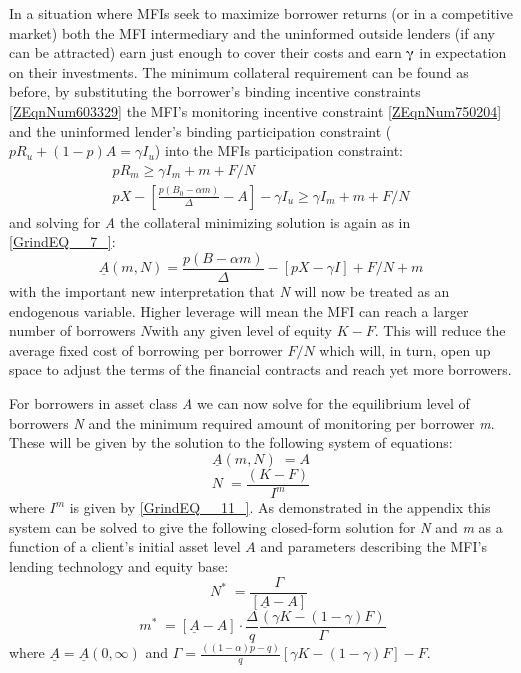 \documentclass{article} %
\begin{document}
In a situation where MFIs seek to maximize borrower returns (or in a competitive market) both the MFI intermediary and the uninformed outside lenders (if any can be attracted) earn just enough to cover their costs and earn $\mathrm{\gammaup }$ in expectation on their investments.  The minimum collateral requirement can be found as before, by substituting the borrower's binding incentive constraints \eqref{ZEqnNum603329} the MFI's monitoring incentive constraint \eqref{ZEqnNum750204} and the uninformed lender's binding participation constraint ($pR_{u} +(1-p)A=\gamma I_{u} $) into the MFIs participation constraint:
\begin{equation} \label{11)} 
\begin{array}{l} {pR_{m} \ge \gamma I_{m} +m+F/N} \\ {pX-\left[\frac{p(B_{0} -\alpha m)}{\Delta } -A\right]-\gamma I_{u} \ge \gamma I_{m} +m+F/N} \end{array} 
\end{equation} 
and solving for \textit{A} the collateral minimizing solution is again as in \eqref{GrindEQ__7_}: 
\[\underline{A}(m,N)=\frac{p(B-\alpha m)}{\Delta } -\left[pX-\gamma I\right]+F/N+m\] 
with the important new interpretation that \textit{N }will now be treated as an endogenous variable.  Higher leverage will mean the MFI can reach a larger number of borrowers $N$with any given level of equity $K-F$.  This will reduce the average fixed cost of borrowing per borrower $F/N$ which will, in turn, open up space to adjust the terms of the financial contracts and reach yet more borrowers.  

For borrowers in asset class \textit{A} we can now solve for the equilibrium level of borrowers \textit{N} and the minimum required amount of monitoring per borrower \textit{m}.  These will be given by the solution to the following system of equations: 
\begin{equation} \label{12)} 
\underline{A}(m,N)\phantom{.} =A 
\end{equation} 
\begin{equation} \label{13)} 
N\phantom{.} =\frac{(K-F)}{I^{m} }  
\end{equation} 
where $I^{m} $ is given by \eqref{GrindEQ__11_}.  As demonstrated in the appendix this system can be solved to give the following closed-form solution for \textit{N }and \textit{m} as a function of a client's initial asset level $A$ and parameters describing the MFI's lending technology and equity base:
\begin{equation} \label{14)} 
N^{*} \phantom{.} =\frac{\Gamma }{\left[\underline{A}-A\right]} \;  
\end{equation} 
\begin{equation} \label{15)} 
\; m^{*} \phantom{.} =\left[\underline{A}-A\right]\cdot \frac{\Delta }{q} \frac{(\gamma K-(1-\gamma )F)}{\Gamma }  
\end{equation} 
where $\underline{A}=\underline{A}(0,\infty )$ and $\Gamma ={\tfrac{((1-\alpha )p-q)}{q}} [\gamma K-(1-\gamma )F]-F$.
\end{document}
